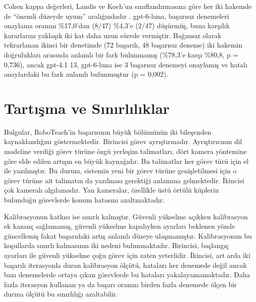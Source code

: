 \documentclass[preprint,12pt]{elsarticle}
\begin{document}
Cohen kappa değerleri, Landis ve Koch'un sınıflandırmasına göre her iki hakemde de ``önemli düzeyde uyum'' aralığındadır \cite{landis1977kappa}. gpt-6-luna, başarısız denemeleri onaylama oranını \%17,0'dan (8/47) \%4,3'e (2/47) düşürmüş, buna karşılık kararlarını yaklaşık iki kat daha uzun sürede vermiştir. Bağımsız olarak tekrarlanan ikinci bir denetimde (72 başarılı, 48 başarısız deneme) iki hakemin doğrulukları arasında anlamlı bir fark bulunmamış (\%78,3'e karşı \%80,8, p = 0,736), ancak gpt-4.1 13, gpt-6-luna ise 3 başarısız denemeyi onaylamış ve hatalı onaylardaki bu fark anlamlı bulunmuştur (p = 0,002).

\hypertarget{tartux131ux15fma-ve-sux131nux131rlux131lux131klar}{%
\section{Tartışma ve Sınırlılıklar}\label{tartux131ux15fma-ve-sux131nux131rlux131lux131klar}}

Bulgular, RoboTeach'in başarısının büyük bölümünün iki bileşenden kaynaklandığını göstermektedir. Birincisi görev ayrıştırmadır. Ayrıştırıcının dil modeline verdiği görev türüne özgü yerleşim talimatları, dört kamera yöntemine göre elde edilen artışın en büyük kaynağıdır. Bu talimatlar her görev türü için el ile yazılmıştır. Bu durum, sistemin yeni bir görev türüne genişletilmesi için o görev türüne ait talimatın da yazılması gerektiği anlamına gelmektedir. İkincisi çok kameralı algılamadır. Yan kameralar, özellikle üstü örtülü küplerin bulunduğu görevlerde konum hatasını azaltmaktadır.

Kalibrasyonun katkısı ise sınırlı kalmıştır. Güvenli yükselme açıkken kalibrasyon ek kazanç sağlamamış, güvenli yükselme kapalıyken ayarları beklenen yönde güncellemiş fakat başarıdaki artış anlamlı düzeye ulaşmamıştır. Kalibrasyonun bu koşullarda sınırlı kalmasının iki nedeni bulunmaktadır. Birincisi, başlangıç ayarları ile güvenli yükselme çoğu görev için zaten yeterlidir. İkincisi, art arda iki başarılı iterasyonla duran kalibrasyon ölçütü, hataları her denemede değil ancak bazı denemelerde ortaya çıkan görevlerde bu hataları yakalayamamaktadır. Daha fazla iterasyon kullanan ya da başarı oranını birden fazla denemede ölçen bir durma ölçütü bu sınırlılığı azaltabilir.
\end{document}
